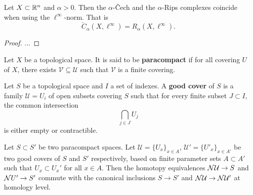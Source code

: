 \begin{lemma} \label{lemma:haus-aux-2}
    Let $ X \subset \mathbb R^n $ and $ \alpha > 0 $. Then the $\alpha$-\v Cech and the $\alpha$-Rips complexes coincide when using the $ \ell^\infty $-norm. That is
    $$
        \check C_\alpha(X, \ell^\infty) = R_\alpha(X, \ell^\infty).
    $$
\end{lemma}
\begin{proof}
    ...
\end{proof}

\begin{definition}
    Let $ X $ be a topological space. It is said to be {\bf paracompact} if for all covering $ U $ of $ X $, there exists $ \mathcal V \subseteq \mathcal U $ such that $ \mathcal V $ is a finite covering.
\end{definition}

\begin{definition}
    Let $ S $ be a topological space and $ I $ a set of indexes. A {\bf good cover} of $ S $ is a family $ \mathcal U = {U_i} $ of open subsets covering $ S $ such that for every finite subset $ J \subset I $, the common intersection
    \begin{equation}
        \bigcap_{j\in J} U_j
    \end{equation}
    is either empty or contractible.
\end{definition}

\begin{lemma} \label{lemma:haus-aux-3}
    Let $ S \subset S' $ be two paracompact spaces. Let $ \mathcal U = \{U_x\}_{x \in A}$, $ \mathcal U' = \{U'_x\}_{x \in A'}$ be two good covers of $ S $ and $ S'$ respectively, based on finite parameter sets $ A \subset A ' $ such that $ U_x \subset U_x' $ for all $ x \in A $. Then the homotopy equivalences $ \mathcal{N} \mathcal U \to S $ and $\mathcal{N} U' \to S' $ commute with the canonical inclusions $ S \to S' $ and $ \mathcal{N} \mathcal U \to \mathcal{N} \mathcal U' $ at homology level.
\end{lemma}

